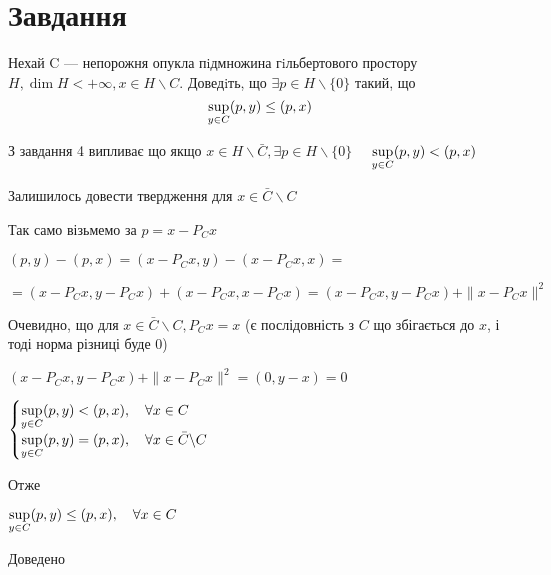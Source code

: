
\chapter{Завдання \theHchapter}


\begin{tcolorbox}[title=Завдання]
    
    Нехай C — непорожня опукла пiдмножина гiльбертового 
    простору $ H, \dim H < + \infty, x \in H \backslash C $.
    Доведiть, що $ \exists p \in H \backslash \{0\} $ такий, що
    $$ \displaystyle\sup_{y \in C} (p, y) \le (p, x) $$

    
\end{tcolorbox}



З завдання 4 випливає що якщо $ x \in H \backslash \bar{C}, 
\exists p \in H\backslash \{0\} \quad $
$ \displaystyle\sup_{y \in C} (p, y) < (p, x) $

Залишилось довести твердження для $x \in \bar{C} \backslash C$

Так само візьмемо за $ p = x - P_Cx $

$ (p, y) - (p, x) = (x - P_Cx, y) - (x - P_Cx,x) = $


$=(x - P_Cx, y - P_Cx) + (x - P_Cx, x - P_Cx) = 
(x - P_Cx, y - P_Cx) + \| x - P_Cx \|^2$


Очевидно, що для $x \in \bar{C} \backslash C, P_Cx = x $
(є послідовність з $C$ що збігається до $x$, і тоді норма різниці буде 0)  

$(x - P_Cx, y - P_Cx) + \| x - P_Cx \|^2 = (0, y - x) = 0 $


$ 
\begin{cases}
    \displaystyle\sup_{y \in C} (p, y) < (p, x), \quad \forall x \in C \\
    \displaystyle\sup_{y \in C} (p, y) = (p, x), \quad \forall x \in \bar{C} \backslash C
\end{cases} $

Отже 


$ \displaystyle\sup_{y \in C} (p, y) \le (p, x) , \quad \forall x \in C $ 


Доведено